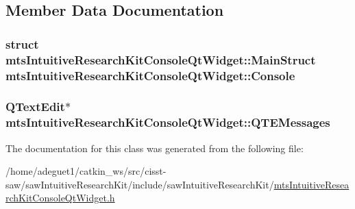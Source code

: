 \subsection{Member Data Documentation}
\hypertarget{classmts_intuitive_research_kit_console_qt_widget_ae208e1eebd3fd748c44c27b8d5b447b1}{
\subsubsection[{Console}]{\setlength{\rightskip}{0pt plus 5cm}struct {\bf mts\-Intuitive\-Research\-Kit\-Console\-Qt\-Widget\-::\-Main\-Struct}  mts\-Intuitive\-Research\-Kit\-Console\-Qt\-Widget\-::\-Console\hspace{0.3cm}{\ttfamily [protected]}}}\label{classmts_intuitive_research_kit_console_qt_widget_ae208e1eebd3fd748c44c27b8d5b447b1}
\hypertarget{classmts_intuitive_research_kit_console_qt_widget_a093140f95bcc868675cf280ac128f697}{
\subsubsection[{Q\-T\-E\-Messages}]{\setlength{\rightskip}{0pt plus 5cm}Q\-Text\-Edit$\ast$ mts\-Intuitive\-Research\-Kit\-Console\-Qt\-Widget\-::\-Q\-T\-E\-Messages\hspace{0.3cm}{\ttfamily [protected]}}}\label{classmts_intuitive_research_kit_console_qt_widget_a093140f95bcc868675cf280ac128f697}


The documentation for this class was generated from the following file\-:\begin{DoxyCompactItemize}
\item 
/home/adeguet1/catkin\-\_\-ws/src/cisst-\/saw/saw\-Intuitive\-Research\-Kit/include/saw\-Intuitive\-Research\-Kit/\hyperlink{mts_intuitive_research_kit_console_qt_widget_8h}{mts\-Intuitive\-Research\-Kit\-Console\-Qt\-Widget.\-h}\end{DoxyCompactItemize}
